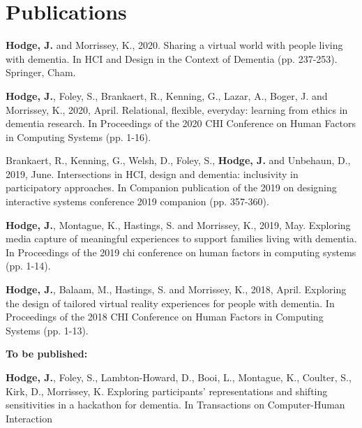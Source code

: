 \chapter{Publications}
\label{Publications}

\textbf{Hodge, J.} and Morrissey, K., 2020. Sharing a virtual world with people living with dementia. In HCI and Design in the Context of Dementia (pp. 237-253). Springer, Cham.
\newline

\textbf{Hodge, J.}, Foley, S., Brankaert, R., Kenning, G., Lazar, A., Boger, J. and Morrissey, K., 2020, April. Relational, flexible, everyday: learning from ethics in dementia research. In Proceedings of the 2020 CHI Conference on Human Factors in Computing Systems (pp. 1-16).
\newline

Brankaert, R., Kenning, G., Welsh, D., Foley, S., \textbf{Hodge, J.} and Unbehaun, D., 2019, June. Intersections in HCI, design and dementia: inclusivity in participatory approaches. In Companion publication of the 2019 on designing interactive systems conference 2019 companion (pp. 357-360).
\newline

\textbf{Hodge, J.}, Montague, K., Hastings, S. and Morrissey, K., 2019, May. Exploring media capture of meaningful experiences to support families living with dementia. In Proceedings of the 2019 chi conference on human factors in computing systems (pp. 1-14).
\newline

\textbf{Hodge, J.}, Balaam, M., Hastings, S. and Morrissey, K., 2018, April. Exploring the design of tailored virtual reality experiences for people with dementia. In Proceedings of the 2018 CHI Conference on Human Factors in Computing Systems (pp. 1-13).
\newline

\textbf{To be published:}
\newline

\textbf{Hodge, J.}, Foley, S., Lambton-Howard, D., Booi, L., Montague, K., Coulter, S., Kirk, D., Morrissey, K. Exploring participants' representations and shifting sensitivities in a hackathon for dementia. In Transactions on Computer-Human Interaction 
\newline

